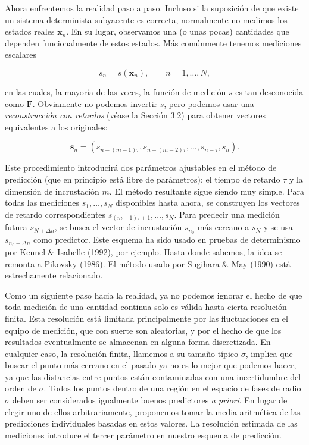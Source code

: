 \documentclass[10pt,a4paper]{book}
\begin{document}
\bigskip

Ahora enfrentemos la realidad paso a paso. Incluso si la suposición de que existe un sistema determinista subyacente es correcta, normalmente no medimos los estados reales $\mathbf{x}_n$. En su lugar, observamos una (o unas pocas) cantidades que dependen funcionalmente de estos estados. Más comúnmente tenemos mediciones escalares

\[
s_n = s(\mathbf{x}_n), \qquad n = 1, \ldots, N,
\tag{4.5}
\]

en las cuales, la mayoría de las veces, la función de medición $s$ es tan desconocida como $\mathbf{F}$. Obviamente no podemos invertir $s$, pero podemos usar una \textit{reconstrucción con retardos} (véase la Sección 3.2) para obtener vectores equivalentes a los originales:

\[
\mathbf{s}_n = (s_{n-(m-1)\tau}, s_{n-(m-2)\tau}, \ldots, s_{n-\tau}, s_n).
\tag{4.6}
\]

Este procedimiento introducirá dos parámetros ajustables en el método de predicción (que en principio está libre de parámetros): el tiempo de retardo $\tau$ y la dimensión de incrustación $m$. El método resultante sigue siendo muy simple. Para todas las mediciones $s_1, \ldots, s_N$ disponibles hasta ahora, se construyen los vectores de retardo correspondientes $s_{(m-1)\tau+1}, \ldots, s_N$. Para predecir una medición futura $s_{N+\Delta n}$, se busca el vector de incrustación $s_{n_0}$ más cercano a $s_N$ y se usa $s_{n_0+\Delta n}$ como predictor. Este esquema ha sido usado en pruebas de determinismo por Kennel \& Isabelle (1992), por ejemplo. Hasta donde sabemos, la idea se remonta a Pikovsky (1986). El método usado por Sugihara \& May (1990) está estrechamente relacionado.

\bigskip

Como un siguiente paso hacia la realidad, ya no podemos ignorar el hecho de que toda medición de una cantidad continua solo es válida hasta cierta resolución finita. Esta resolución está limitada principalmente por las fluctuaciones en el equipo de medición, que con suerte son aleatorias, y por el hecho de que los resultados eventualmente se almacenan en alguna forma discretizada. En cualquier caso, la resolución finita, llamemos a su tamaño típico $\sigma$, implica que buscar el punto más cercano en el pasado ya no es lo mejor que podemos hacer, ya que las distancias entre puntos están contaminadas con una incertidumbre del orden de $\sigma$. Todos los puntos dentro de una región en el espacio de fases de radio $\sigma$ deben ser considerados igualmente buenos predictores \textit{a priori}. En lugar de elegir uno de ellos arbitrariamente, proponemos tomar la media aritmética de las predicciones individuales basadas en estos valores. La resolución estimada de las mediciones introduce el tercer parámetro en nuestro esquema de predicción.
\end{document}
